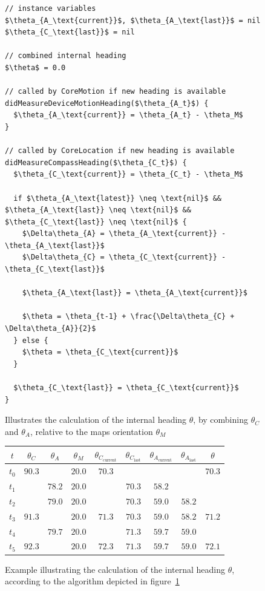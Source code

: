 \begin{figure}
\begin{lstlisting}[mathescape]
// instance variables
$\theta_{A_\text{current}}$, $\theta_{A_\text{last}}$ = nil
$\theta_{C_\text{last}}$ = nil

// combined internal heading
$\theta$ = 0.0

// called by CoreMotion if new heading is available
didMeasureDeviceMotionHeading($\theta_{A_t}$) {
  $\theta_{A_\text{current}} = \theta_{A_t} - \theta_M$
}

// called by CoreLocation if new heading is available
didMeasureCompassHeading($\theta_{C_t}$) {
  $\theta_{C_\text{current}} = \theta_{C_t} - \theta_M$
  
  if $\theta_{A_\text{latest}} \neq \text{nil}$ && $\theta_{A_\text{last}} \neq \text{nil}$ && $\theta_{C_\text{last}} \neq \text{nil}$ {
    $\Delta\theta_{A} = \theta_{A_\text{current}} - \theta_{A_\text{last}}$
    $\Delta\theta_{C} = \theta_{C_\text{current}} - \theta_{C_\text{last}}$
    
    $\theta_{A_\text{last}} = \theta_{A_\text{current}}$
    
    $\theta = \theta_{t-1} + \frac{\Delta\theta_{C} + \Delta\theta_{A}}{2}$
  } else {
    $\theta = \theta_{C_\text{current}}$
  }
  
  $\theta_{C_\text{last}} = \theta_{C_\text{current}}$
}
\end{lstlisting}
\caption{Illustrates the calculation of the internal heading $\theta$, by combining $\theta_C$ and $\theta_A$, relative to the maps orientation $\theta_M$}
\label{lst:mm_heading}
\end{figure}

\begin{figure}
\begin{tabular}{c|ccc|c|ccc||c}
\textbf{$t$} & \textbf{$\theta_C$} & \textbf{$\theta_A$} & \textbf{$\theta_M$} & $\theta_{C_\text{current}}$ & $\theta_{C_\text{last}}$ & $\theta_{A_\text{current}}$ & $\theta_{A_\text{last}}$ & \textbf{$\theta$}\\
\hline
$t_0$ & $90.3$ & & $20.0$ & $70.3$ & & & & $70.3$\\
$t_1$ & & $78.2$ & $20.0$ & & $70.3$ & $58.2$ & &\\
$t_2$ & & $79.0$ & $20.0$ & & $70.3$ & $59.0$ & $58.2$ &\\
$t_3$ & $91.3$ & & $20.0$ & $71.3$ & $70.3$ & $59.0$ & $58.2$ & $71.2$\\
$t_4$ & & $79.7$ & $20.0$ & & $71.3$ & $59.7$ & $59.0$ &\\
$t_5$ & $92.3$ & & $20.0$ & $72.3$ & $71.3$ & $59.7$ & $59.0$ & $72.1$\\

\end{tabular}
\caption{Example illustrating the calculation of the internal heading $\theta$, according to the algorithm depicted in figure~\ref{lst:mm_heading}}
\label{tab:mm_heading}
\end{figure}

